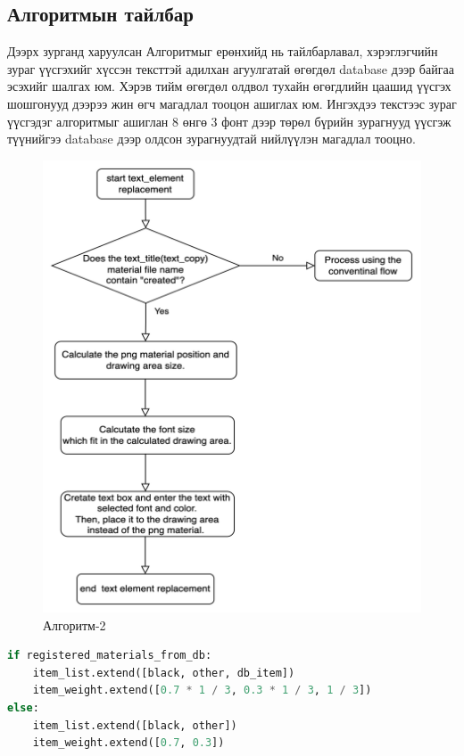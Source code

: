 \subsection{Алгоритмын тайлбар}
Дээрх зурганд харуулсан Алгоритмыг ерөнхийд нь тайлбарлавал, хэрэглэгчийн зураг үүсгэхийг хүссэн тексттэй адилхан агуулгатай өгөгдөл database дээр байгаа эсэхийг шалгах юм. Хэрэв тийм өгөгдөл олдвол тухайн өгөгдлийн цаашид үүсгэх шошгонууд дээрээ жин өгч магадлал тооцон ашиглах юм.
Ингэхдээ текстээс зураг үүсгэдэг алгоритмыг ашиглан 8 өнгө 3 фонт дээр төрөл бүрийн зурагнууд үүсгэж түүнийгээ database дээр олдсон зурагнуудтай нийлүүлэн магадлал тооцно.
\begin{figure}
	\centering
	\includegraphics[scale=0.6]{src/pictures/algorithm2.png}
	\caption{Алгоритм-2}
\end{figure}

\begin{lstlisting}[language=Python,caption={Сонголт хийх код},frame=single]
	if registered_materials_from_db:
	item_list.extend([black, other, db_item])
	item_weight.extend([0.7 * 1 / 3, 0.3 * 1 / 3, 1 / 3])
else:
	item_list.extend([black, other])
	item_weight.extend([0.7, 0.3])
\end{lstlisting}

